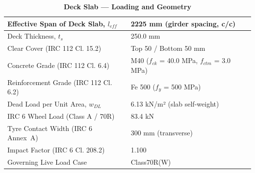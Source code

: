 \documentclass[12pt,a4paper]{report}
\numberwithin{table}{chapter}
\numberwithin{figure}{chapter}
\begin{document}
\vspace{1em}
\begin{longtable}{|L{5.5cm}|p{10.0cm}|}
\caption{\textbf{Deck Slab --- Loading and Geometry}}
\hline
\textnormal{Effective Span of Deck Slab, $l_{eff}$} & 2225 mm (girder spacing, c/c) \\[6pt]
\hline
\textnormal{Deck Thickness, $t_s$} & 250.0 mm \\[6pt]
\hline
\textnormal{Clear Cover (IRC 112 Cl. 15.2)} & Top 50 / Bottom 50 mm \\[6pt]
\hline
\textnormal{Concrete Grade (IRC 112 Cl. 6.4)} & M40 ($f_{ck}$ = 40.0 MPa, $f_{ctm}$ = 3.0 MPa) \\[6pt]
\hline
\textnormal{Reinforcement Grade (IRC 112 Cl. 6.2)} & Fe 500 ($f_y$ = 500 MPa) \\[6pt]
\hline
\textnormal{Dead Load per Unit Area, $w_{DL}$} & 6.13 kN/m² (slab self-weight) \\[6pt]
\hline
\textnormal{IRC 6 Wheel Load (Class A / 70R)} & 83.4 kN \\[6pt]
\hline
\textnormal{Tyre Contact Width (IRC 6 Annex~A)} & 300 mm (transverse) \\[6pt]
\hline
\textnormal{Impact Factor (IRC 6 Cl. 208.2)} & 1.100 \\[6pt]
\hline
\textnormal{Governing Live Load Case} & Class70R(W) \\[6pt]
\hline
\end{longtable}
\end{document}
